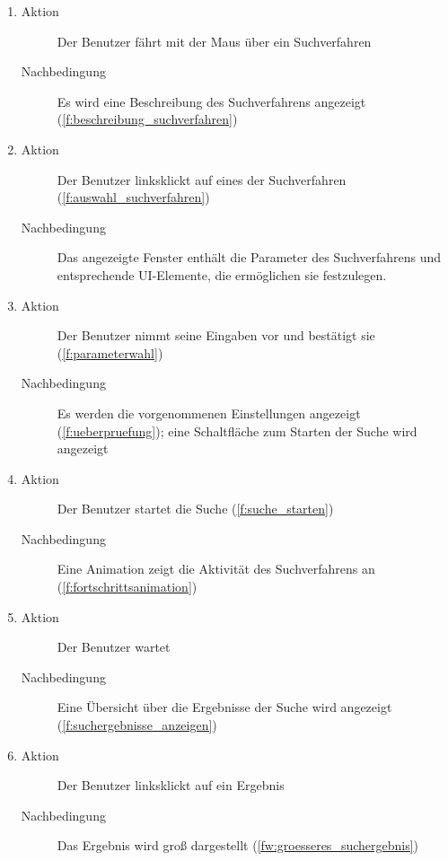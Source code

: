 \begin{enumerate} [label=\bfseries /TS \arabic*0/, leftmargin=*]
\begin{enumerate}
		\item
		\begin{description}
			\item[Aktion] Der Benutzer fährt mit der Maus über ein Suchverfahren
			\item[Nachbedingung] Es wird eine Beschreibung des Suchverfahrens angezeigt (\ref{f:beschreibung_suchverfahren})
		\end{description}
		\item
		\begin{description}
			\item[Aktion] Der Benutzer linksklickt auf eines der Suchverfahren (\ref{f:auswahl_suchverfahren})
			\item[Nachbedingung] Das angezeigte Fenster enthält die Parameter des Suchverfahrens und entsprechende UI-Elemente, die ermöglichen sie festzulegen.
		\end{description}
		\item
		\begin{description}
			\item[Aktion] Der Benutzer nimmt seine Eingaben vor und bestätigt sie (\ref{f:parameterwahl})
			\item[Nachbedingung] Es werden die vorgenommenen Einstellungen angezeigt (\ref{f:ueberpruefung}); eine Schaltfläche zum Starten der Suche wird angezeigt
		\end{description}
		\item
		\begin{description}
			\item[Aktion] Der Benutzer startet die Suche (\ref{f:suche_starten})
			\item[Nachbedingung] Eine Animation zeigt die Aktivität des Suchverfahrens an (\ref{f:fortschrittsanimation})
		\end{description}
		\item
		\begin{description}
			\item[Aktion] Der Benutzer wartet
			\item[Nachbedingung] Eine Übersicht über die Ergebnisse der Suche wird angezeigt (\ref{f:suchergebnisse_anzeigen})
		\end{description}
		\item
		\begin{description}
			\item[Aktion] Der Benutzer linksklickt auf ein Ergebnis
			\item[Nachbedingung] Das Ergebnis wird groß dargestellt (\ref{fw:groesseres_suchergebnis})

\end{description}
\end{enumerate}
\end{enumerate}
